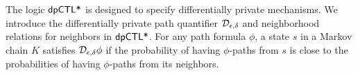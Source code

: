 
The logic $\textsf{dpCTL*}$ is designed to specify differentially private
mechanisms. We introduce the differentially private path quantifier
$\mathcal{D}_{{\epsilon}, {\delta}}$ and neighborhood relations for neighbors in
$\textsf{dpCTL*}$. For any path formula 
$\phi$, a state $s$ in a Markov chain $K$ satisfies
$\mathcal{D}_{{\epsilon}, {\delta}} \phi$ if the probability of having $\phi$-paths
from $s$ is close to the probabilities of
having $\phi$-paths from its neighbors.

